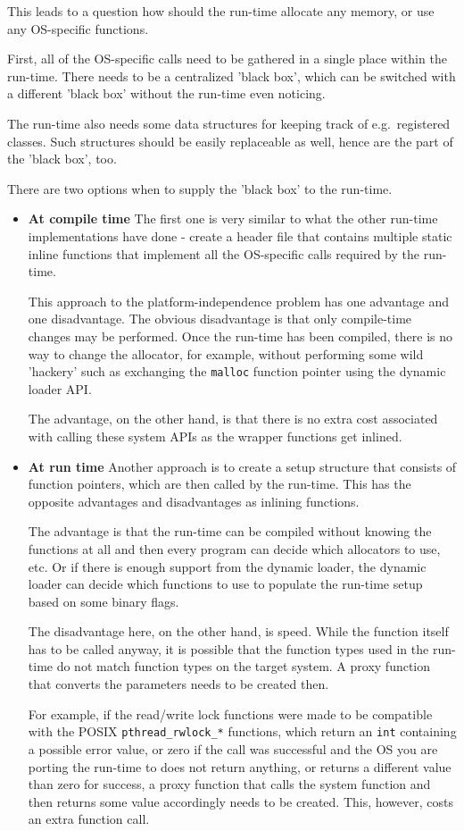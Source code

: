 This leads to a question how should the run-time allocate any memory, or use any OS-specific functions.

First, all of the OS-specific calls need to be gathered in a single place within the run-time. There needs to be a centralized 'black box', which can be switched with a different 'black box' without the run-time even noticing.

The run-time also needs some data structures for keeping track of e.g.\ registered classes. Such structures should be easily replaceable as well, hence are the part of the 'black box', too.

There are two options when to supply the 'black box' to the run-time.

\begin{itemize}
\item{\bf{At compile time}}
The first one is very similar to what the other run-time implementations have done - create a header file that contains multiple static inline functions that implement all the OS-specific calls required by the run-time.

This approach to the platform-independence problem has one advantage and one disadvantage. The obvious disadvantage is that only compile-time changes may be performed. Once the run-time has been compiled, there is no way to change the allocator, for example, without performing some wild 'hackery' such as exchanging the \verb=malloc= function pointer using the dynamic loader API.

The advantage, on the other hand, is that there is no extra cost associated with calling these system APIs as the wrapper functions get inlined.

\item{\bf{At run time}}
Another approach is to create a setup structure that consists of function pointers, which are then called by the run-time. This has the opposite advantages and disadvantages as inlining functions.

The advantage is that the run-time can be compiled without knowing the functions at all and then every program can decide which allocators to use, etc. Or if there is enough support from the dynamic loader, the dynamic loader can decide which functions to use to populate the run-time setup based on some binary flags.

The disadvantage here, on the other hand, is speed. While the function itself has to be called anyway, it is possible that the function types used in the run-time do not match function types on the target system. A proxy function that converts the parameters needs to be created then.

For example, if the read/write lock functions were made to be compatible with the POSIX \verb=pthread_rwlock_*= functions, which return an \verb=int= containing a possible error value, or zero if the call was successful and the OS you are porting the run-time to does not return anything, or returns a different value than zero for success, a proxy function that calls the system function and then returns some value accordingly needs to be created. This, however, costs an extra function call.
\end{itemize}

